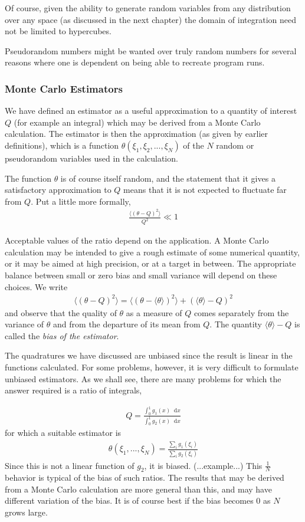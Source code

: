 \documentclass[twoside,english]{uiofysmaster}
\newcommand*\dif{\mathop{}\!\mathrm{d}}
\begin{document}
Of course, given the ability to generate random variables from any distribution over any space (as discussed in the next chapter) the domain of integration need not be limited to hypercubes.

Pseudorandom numbers might be wanted over truly random numbers for several reasons where one is dependent on being able to recreate program runs.

\subsubsection{Monte Carlo Estimators}
We have defined an estimator as a useful approximation to a quantity of interest $Q$ (for example an integral) which may be derived from a Monte Carlo calculation. The estimator is then the approximation (as given by earlier definitions), which is a function $\theta(\xi_1, \xi_2, ..., \xi_N)$ of the $N$ random or pseudorandom variables used in the calculation.

The function $\theta$ is of course itself random, and the statement that it gives a
satisfactory approximation to $Q$ means that it is not expected to fluctuate far from $Q$. Put a little more formally,
\begin{align}
	\frac{\langle (\theta - Q)^2 \rangle}{Q^2} \ll 1
\end{align}

Acceptable values of the ratio depend on the application. A Monte Carlo calculation may be intended to give a rough estimate of some numerical quantity, or it may be aimed at high precision, or at a target in between. The appropriate balance between small or zero bias and small variance will depend on these choices.
We write
\begin{align}
	\langle (\theta - Q)^2 \rangle = \langle (\theta -\langle \theta \rangle)^2 \rangle
	+ (\langle \theta \rangle - Q)^2
\end{align}
and observe that the quality of $\theta$ as a measure of $Q$ comes separately from the variance of $\theta$ and from the departure of its mean from $Q$. The quantity $\langle \theta \rangle - Q$ is called the \textit{bias of the estimator}. 

The quadratures we have discussed are unbiased since the result is linear in the functions calculated. For some problems, however, it is very difficult to formulate unbiased estimators. As we shall see, there are many problems for which the answer required is a ratio of integrals,

\begin{align}
	Q = \frac{\int_0^1 g_1 (x) \dif x}{\int_0^1 g_2 (x) \dif x} 
\end{align}
for which a suitable estimator is
\begin{align}
	\theta (\xi_1, ..., \xi_N) = \frac{\sum_i g_1 (\xi_i)}{\sum_i g_2 (\xi_i)}
\end{align}
Since this is not a linear function of $g_2$, it is biased. (...example...) This $\frac{1}{N}$ behavior is typical of the bias of such ratios. The results that may be derived from a Monte Carlo calculation are more general than this, and may have different variation of the bias. It is of course best if the bias becomes 0 as $N$ grows large.
\end{document}
